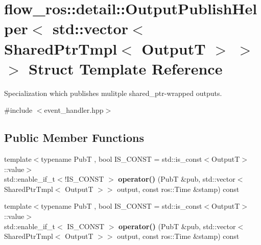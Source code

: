 \hypertarget{structflow__ros_1_1detail_1_1_output_publish_helper_3_01std_1_1vector_3_01_shared_ptr_tmpl_3_01_output_t_01_4_01_4_01_4}{}\section{flow\+\_\+ros\+:\+:detail\+:\+:Output\+Publish\+Helper$<$ std\+:\+:vector$<$ Shared\+Ptr\+Tmpl$<$ OutputT $>$ $>$ $>$ Struct Template Reference}
\label{structflow__ros_1_1detail_1_1_output_publish_helper_3_01std_1_1vector_3_01_shared_ptr_tmpl_3_01_output_t_01_4_01_4_01_4}


Specialization which publishes mulitple shared\+\_\+ptr-\/wrapped outputs.  




{\ttfamily \#include $<$event\+\_\+handler.\+hpp$>$}

\subsection*{Public Member Functions}
\begin{DoxyCompactItemize}
\item 
\mbox{\label{structflow__ros_1_1detail_1_1_output_publish_helper_3_01std_1_1vector_3_01_shared_ptr_tmpl_3_01_output_t_01_4_01_4_01_4_a761e87ac0229a6add111ff597ab20d7b}} 
{\footnotesize template$<$typename PubT , bool I\+S\+\_\+\+C\+O\+N\+ST = std\+::is\+\_\+const$<$\+Output\+T$>$\+::value$>$ }\\std\+::enable\+\_\+if\+\_\+t$<$!I\+S\+\_\+\+C\+O\+N\+ST $>$ {\bfseries operator()} (PubT \&pub, std\+::vector$<$ Shared\+Ptr\+Tmpl$<$ OutputT $>$$>$ output, const ros\+::\+Time \&stamp) const
\item 
\mbox{\label{structflow__ros_1_1detail_1_1_output_publish_helper_3_01std_1_1vector_3_01_shared_ptr_tmpl_3_01_output_t_01_4_01_4_01_4_a9d9cc39a9e6abb758c3c619fae7b2a1a}} 
{\footnotesize template$<$typename PubT , bool I\+S\+\_\+\+C\+O\+N\+ST = std\+::is\+\_\+const$<$\+Output\+T$>$\+::value$>$ }\\std\+::enable\+\_\+if\+\_\+t$<$ I\+S\+\_\+\+C\+O\+N\+ST $>$ {\bfseries operator()} (PubT \&pub, std\+::vector$<$ Shared\+Ptr\+Tmpl$<$ OutputT $>$$>$ output, const ros\+::\+Time \&stamp) const
\end{DoxyCompactItemize}


